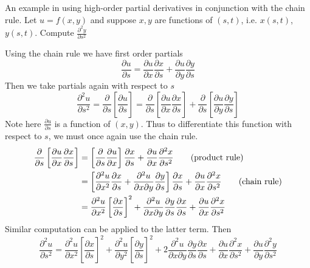 \documentclass[11pt]{article}
\begin{document}
$ $\\
An example in using high-order partial derivatives in conjunction with the chain rule.
Let $u=f(x,y)$ and suppose $x,y$ are functions of $(s,t)$, i.e. $x(s,t)$, $y(s,t)$. Compute $\frac{\partial^2 y}{\partial s^2}$
\begin{solution}
  $ $\\
  Using the chain rule we have first order partials
  \[
    \frac{\partial u}{\partial s} = \frac{\partial u}{\partial x}\frac{\partial x}{\partial s} + \frac{\partial u}{\partial y}\frac{\partial y}{\partial s}
  \]
  Then we take partials again with respect to $s$
  \[
    \frac{\partial^2 u}{\partial s^2} = \frac{\partial}{\partial s}\left[\frac{\partial u}{\partial s}\right] = \frac{\partial}{\partial s} \left[\frac{\partial u}{\partial x}\frac{\partial x}{\partial s}\right] + \frac{\partial}{\partial s} \left[\frac{\partial u}{\partial y}\frac{\partial y}{\partial s}\right]
  \]
  Note here $\frac{\partial u}{\partial s}$ is a function of $(x,y)$. Thus to differentiate this function with respect to $s$, we must once again use the chain rule.
  \begin{align*}
    \frac{\partial}{\partial s}\left[ \frac{\partial u}{\partial x}\frac{\partial x}{\partial s}\right] &= \left[ \frac{\partial}{\partial s}\frac{\partial u}{\partial x}\right]\frac{\partial x}{\partial s} + \frac{\partial u}{\partial x}\frac{\partial^2 x}{\partial s^2} \tag{\text{product rule}}\\
    &= \left[ \frac{\partial^2 u}{\partial x^2} \frac{\partial x}{\partial s} + \frac{\partial^2 u}{\partial x \partial y}\frac{\partial y}{\partial s} \right] \frac{\partial x}{\partial s} + \frac{\partial u}{\partial x}\frac{\partial^2 x}{\partial s^2} \tag{\text{chain rule}}\\
    &= \frac{\partial^2 u}{\partial x^2} \left[ \frac{\partial x}{\partial s} \right]^2 + \frac{\partial^2 u}{\partial x \partial y}\frac{\partial y}{\partial s}\frac{\partial x}{\partial s} + \frac{\partial u}{\partial x}\frac{\partial^2 x}{\partial s^2}\\
  \end{align*}
  Similar computation can be applied to the latter term. Then
  \[
    \frac{\partial^2 u}{\partial s^2} =  \frac{\partial^2 u}{\partial x^2} \left[ \frac{\partial x}{\partial s} \right]^2 + \frac{\partial^2 u}{\partial y^2} \left[ \frac{\partial y}{\partial s} \right]^2 + 2 \frac{\partial^2 u}{\partial x \partial y} \frac{\partial y}{\partial s}\frac{\partial x}{\partial s} + \frac{\partial u}{\partial x}\frac{\partial^2 x}{\partial s^2} + \frac{\partial u}{\partial y}\frac{\partial^2 y}{\partial s^2}
  \]
\end{solution}
\end{document}
